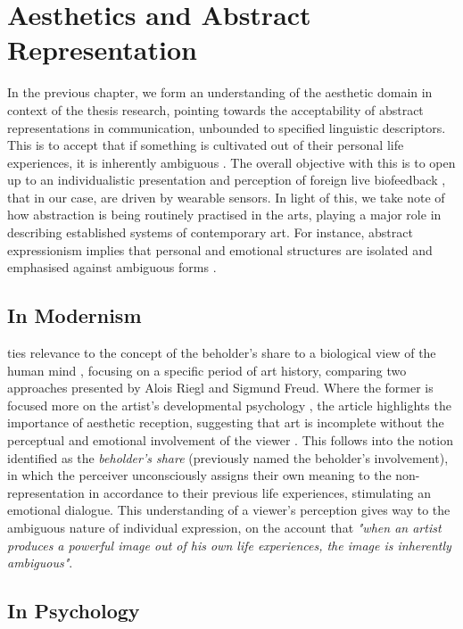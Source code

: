 \section{Aesthetics and Abstract Representation}
\label{lit_review:abstract}

In the previous chapter, we form an understanding of the aesthetic domain in context of the thesis research, pointing towards the acceptability of abstract representations in communication, unbounded to specified linguistic descriptors. This is to accept that if something is cultivated out of their personal life experiences, it is inherently ambiguous \cite{kaplan_esthetic_1948}. The overall objective with this is to open up to an individualistic presentation and perception of foreign live biofeedback \cite{lux_live_2018}, that in our case, are driven by wearable sensors. In light of this, we take note of how abstraction is being routinely practised in the arts, playing a major role in describing established systems of contemporary art. For instance, abstract expressionism implies that personal and emotional structures are isolated and emphasised against ambiguous forms \cite{pollock_action_2008}. 

\subsection{In Modernism}

\citeauthor{kandel_two_2013} ties relevance to the concept of the beholder's share to a biological view of the human mind \cite{kandel_two_2013}, focusing on a specific period of art history, comparing two approaches presented by Alois Riegl and Sigmund Freud. Where the former is focused more on the artist's developmental psychology \cite{freud_leonardo_1999}, the article highlights the importance of aesthetic reception, suggesting that art is incomplete without the perceptual and emotional involvement of the viewer \cite{riegl_group_1999}. This follows into the notion identified as the \textit{beholder's share} (previously named the beholder's involvement), in which the perceiver unconsciously assigns their own meaning to the non-representation in accordance to their previous life experiences, stimulating an emotional dialogue. This understanding of a viewer's perception gives way to the ambiguous nature of individual expression, on the account that \textit{"when an artist produces a powerful image out of his own life experiences, the image is inherently ambiguous"}.

\subsection{In Psychology}

